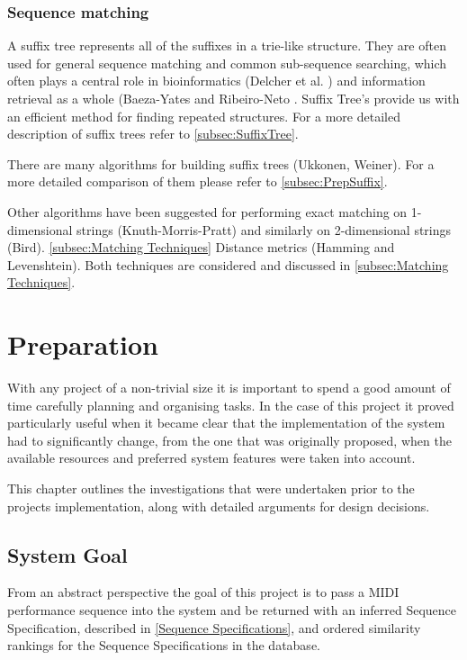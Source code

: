\documentclass[12pt,twoside,notitlepage]{report}
\begin{document}
		
		
	\subsection{Sequence matching}
		A suffix tree represents all of the suffixes in a trie-like structure. They are often used for general sequence matching and common sub-sequence searching, which often plays a central role in bioinformatics (Delcher et al. \cite{Delcher1999}) and information retrieval as a whole (Baeza-Yates and Ribeiro-Neto \cite{Yates1999}. Suffix Tree's provide us with an efficient method for finding repeated structures\cite{Gusfield1999}. For a more detailed description of suffix trees refer to \ref{subsec:SuffixTree}.
		
		There are many algorithms for building suffix trees (Ukkonen\cite{Ukkonen1995}, Weiner\cite{Weiner1973}). For a more detailed comparison of them please refer to \ref{subsec:PrepSuffix}.
		
		Other algorithms have been suggested for performing exact matching on 1-dimensional strings (Knuth-Morris-Pratt\cite{KnuthMorrisPratt1977}) and similarly on 2-dimensional strings (Bird\cite{Bird1977}).  \ref{subsec:Matching Techniques} Distance metrics (Hamming\cite{Hamming1950} and Levenshtein\cite{Levenshtein1966}). Both techniques are considered and discussed in \ref{subsec:Matching Techniques}.
			


	
\cleardoublepage

\chapter{Preparation}

	With any project of a non-trivial size it is important to spend a good amount of time carefully planning and organising tasks. In the case of this project it proved particularly useful when it became clear that the implementation of the system had to significantly change, from the one that was originally proposed, when the available resources and preferred system features were taken into account.
	
	This chapter outlines the investigations that were undertaken prior to the projects implementation, along with detailed arguments for design decisions.	
	
	\section{System Goal}
	From an abstract perspective the goal of this project is to pass a MIDI performance sequence into the system and be returned with an inferred Sequence Specification, described in \ref{Sequence Specifications}, and ordered similarity rankings for the Sequence Specifications in the database.
	
\end{document}
